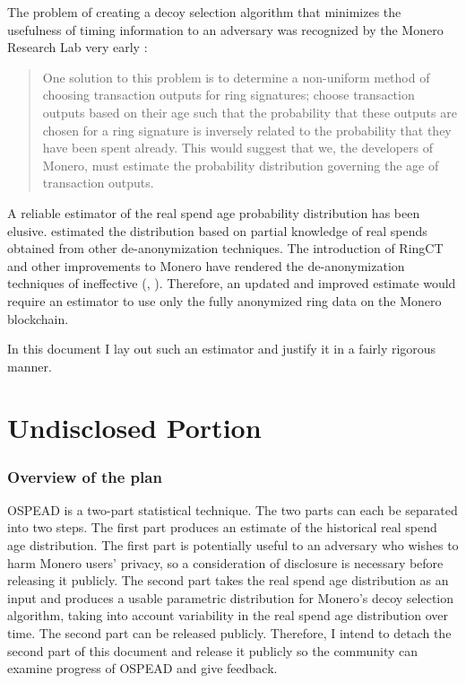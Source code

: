 \documentclass[english]{article}
\begin{document}
The problem of creating a decoy selection algorithm that minimizes
the usefulness of timing information to an adversary was recognized
by the Monero Research Lab very early \cite{Mackenzie2015}:
\begin{quote}
One solution to this problem is to determine a non-uniform method
of choosing transaction outputs for ring signatures; choose transaction
outputs based on their age such that the probability that these outputs
are chosen for a ring signature is inversely related to the probability
that they have been spent already. This would suggest that we, the
developers of Monero, must estimate the probability distribution governing
the age of transaction outputs.
\end{quote}
A reliable estimator of the real spend age probability distribution
has been elusive. \cite{2018} estimated the distribution based on
partial knowledge of real spends obtained from other de-anonymization
techniques. The introduction of RingCT and other improvements to Monero
have rendered the de-anonymization techniques of \cite{2018} ineffective
(\cite{Ye2020}, \cite{Vijayakumaran2021}). Therefore, an updated
and improved estimate would require an estimator to use only the fully
anonymized ring data on the Monero blockchain.

In this document I lay out such an estimator and justify it in a fairly
rigorous manner.

\part{Undisclosed Portion}

\section{Overview of the plan}

OSPEAD is a two-part statistical technique. The two parts can each
be separated into two steps. The first part produces an estimate of
the historical real spend age distribution. The first part is potentially
useful to an adversary who wishes to harm Monero users' privacy, so
a consideration of disclosure is necessary before releasing it publicly.
The second part takes the real spend age distribution as an input
and produces a usable parametric distribution for Monero's decoy selection
algorithm, taking into account variability in the real spend age distribution
over time. The second part can be released publicly. Therefore, I
intend to detach the second part of this document and release it publicly
so the community can examine progress of OSPEAD and give feedback.
\end{document}
